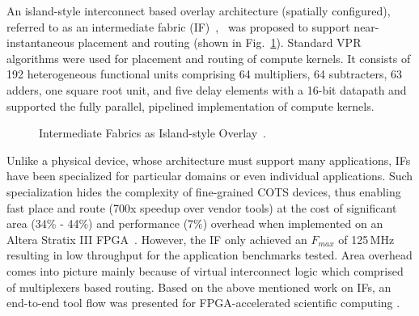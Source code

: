 An island-style interconnect based overlay architecture (spatially configured), referred to as an intermediate fabric (IF)~\cite{coole_intermediate_2010},~\cite{stitt_intermediate_2011} was proposed to support near-instantaneous placement and routing (shown in Fig.~\ref{if}).
Standard VPR~\cite{betz1997vpr} algorithms were used for placement and routing of compute kernels.
It consists of 192 heterogeneous functional units comprising 64 multipliers, 64 subtracters, 63 adders, one square root unit, and five delay elements with a 16-bit datapath and supported the fully parallel, pipelined implementation of compute kernels. 


\begin{figure}[!h]
	\centering
	\caption{Intermediate Fabrics as Island-style Overlay~\cite{coole_intermediate_2010}.}
	\label{if}
\end{figure}

Unlike a physical device, whose architecture must support many applications, IFs have been specialized for particular domains or even individual applications. Such specialization hides the complexity of fine-grained \ac{COTS} devices, thus enabling fast place and route (700x speedup over vendor tools) at the cost of significant area (34\% - 44\%) and performance (7\%) overhead when implemented on an Altera Stratix III FPGA~\cite{stitt_intermediate_2011}. 
However, the IF only achieved an $F_{\mathit{max}}$ of 125\,MHz resulting in low throughput for the application benchmarks tested.
Area overhead comes into picture mainly because of virtual interconnect logic which comprised of multiplexers based routing. 
Based on the above mentioned work on IFs, an end-to-end tool flow was presented for FPGA-accelerated scientific computing \cite{stitt_end--end_2011}.

